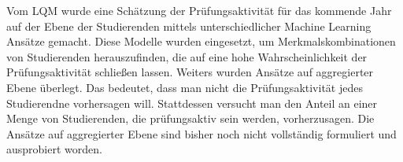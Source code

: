 Vom LQM wurde eine Sch\"atzung der Pr\"ufungsaktivit\"at f\"ur das kommende Jahr auf der Ebene der Studierenden
mittels unterschiedlicher Machine Learning Ans\"atze gemacht. Diese Modelle wurden eingesetzt, um Merkmalskombinationen von Studierenden herauszufinden, 
die auf eine hohe Wahrscheinlichkeit der Pr\"ufungsaktivit\"at schlie{\ss}en lassen.
Weiters wurden Ans\"atze auf aggregierter Ebene \"uberlegt. Das bedeutet, dass man nicht die Pr\"ufungsaktivit\"at jedes Studierendne vorhersagen will. Stattdessen
versucht man den Anteil an einer Menge von Studierenden, die pr\"ufungsaktiv sein werden, vorherzusagen. 
Die Ans\"atze auf aggregierter Ebene sind bisher noch nicht vollst\"andig formuliert und ausprobiert worden. \\